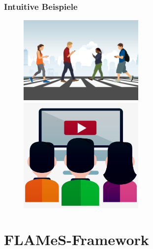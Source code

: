 \documentclass{beamer}
\begin{document}
\begin{frame}
  \frametitle{Intuitive Beispiele}
  \begin{figure}
    \centering
    \includegraphics[width=0.55\textwidth]{images/smartphone_walking.png}
    \includegraphics[width=0.55\textwidth]{images/watching_tv.jpeg}
  \end{figure}
\end{frame}

\section{FLAMeS-Framework}
\end{document}
